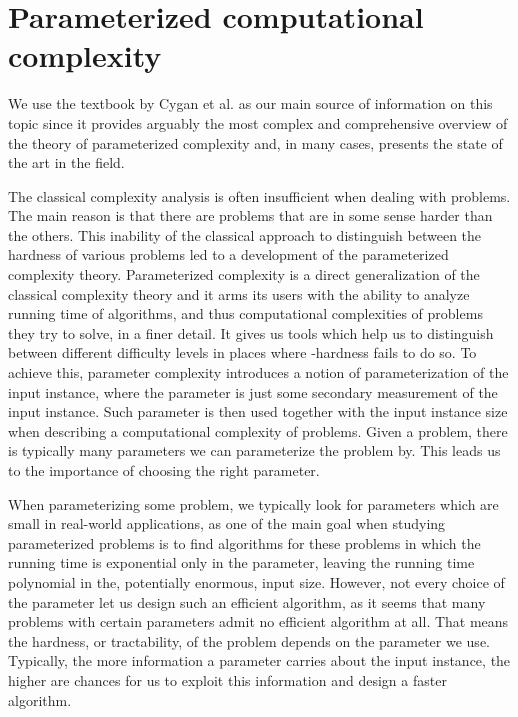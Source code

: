 \section{Parameterized computational complexity}\label{section:ParamComp}

We use the textbook by Cygan et al. \cite{Cygan2015} as our main source of information on this topic since it
provides arguably the most complex and comprehensive overview of the theory of parameterized complexity and,
in many cases, presents the state of the art in the field.

The classical complexity analysis is often insufficient when dealing with \NPh problems.
The main reason is that there are \NPh problems that are in some sense harder than the others.
This inability of the classical approach to distinguish between the hardness of various \NPh problems
led to a development of the parameterized complexity theory.
Parameterized complexity is a direct generalization of the classical complexity theory and it arms its users
with the ability to analyze running time of algorithms, and thus computational complexities of problems
they try to solve, in a finer detail.
It gives us tools which help us to distinguish between different difficulty levels in places where
\NP-hardness fails to do so.
To achieve this, parameter complexity introduces a notion of parameterization of the input instance, where
the parameter is just some secondary measurement of the input instance.
Such parameter is then used together with the input instance size when describing a computational complexity of \NPh problems.
Given a problem, there is typically many parameters we can parameterize the problem by.
This leads us to the importance of choosing the right parameter.

When parameterizing some problem, we typically look for parameters which are small in real-world applications,
as one of the main goal when studying parameterized problems is to find algorithms for these problems in which
the running time is exponential only in the parameter, leaving the running time polynomial in the, potentially enormous, input size.
However, not every choice of the parameter let us design such an efficient algorithm, as it seems that many problems with
certain parameters admit no efficient algorithm at all.
That means the hardness, or tractability, of the problem depends on the parameter we use.
Typically, the more information a parameter carries about the input instance, the higher are chances for us to exploit this
information and design a faster algorithm.


